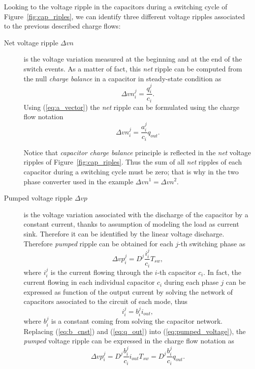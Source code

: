 Looking to the voltage ripple in the capacitors during a switching cycle of Figure~\ref{fig:cap_riples}, we can identify three different voltage ripples associated to the previous described charge flows:
\begin{description}
  \item[Net voltage ripple $\Delta vn$] is the voltage variation measured at the beginning and at the end of the switch events. As a matter of fact, this \emph{net} ripple can be computed from the null \emph{charge balance} in a capacitor in steady-state condition as
      \begin{equation}
        \Delta {vn}^j_i  = \frac{q_i ^j }{c_i}.
        \label{eq:net_voltage}
      \end{equation}
      Using (\ref{eq:a_vector}) the \emph{net} ripple can be formulated using the charge flow notation
      \begin{equation}
        \Delta {vn}^j_i  = \frac{a_i ^j }{c_i} {q_{out}}.
        \label{eq:net_voltage_cf}
      \end{equation}

      Notice that \emph{capacitor charge balance} principle is reflected in the \emph{net }voltage ripples of Figure~\ref{fig:cap_riples}. Thus the sum of all \emph{net} ripples of each capacitor during a switching cycle  must be zero; that is why in the two phase converter used in the example $\Delta vn^1 = \Delta vn^2$.

  \item[Pumped voltage ripple $\Delta vp$] is the voltage variation associated with the discharge of the capacitor by a constant current, thanks to assumption of modeling the load as current sink. Therefore it can be identified by the linear voltage discharge. Therefore \emph{pumped} ripple can be obtained for each $j$-th switching phase as
      \begin{equation}
        \Delta {vp}^j_i  = D^j \frac{i_i^j}{c_i }T_{sw},
      \label{eq:pumped_voltage}
      \end{equation}
      where $i_i^j$ is the current flowing through the $i$-th capacitor $c_i$. In fact, the current flowing in each individual capacitor $c_i$ during each phase $j$ can be expressed as function of the output current by solving the network of capacitors associated to the circuit of each mode, thus
      \begin{equation}
        i_i^j = b_i^j i_{out} ,
      \label{eq:b_cnst}
      \end{equation}
      where $ b_i^j $ is a constant coming from solving the capacitor network.  Replacing (\ref{eq:b_cnst}) and (\ref{eq:q_out}) into (\ref{eq:pumped_voltage}), the \emph{pumped} voltage ripple can be expressed in the charge flow notation as
      \begin{equation}
        \Delta {vp}^j_i  = D^j \frac{b_i^j}{c_i } {i_{out}} {T_{sw}} = D^j \frac{b_i^j}{c_i } {q_{out}}.
      \label{eq:pumped_voltage_cf}
      \end{equation}
      

\end{description}
